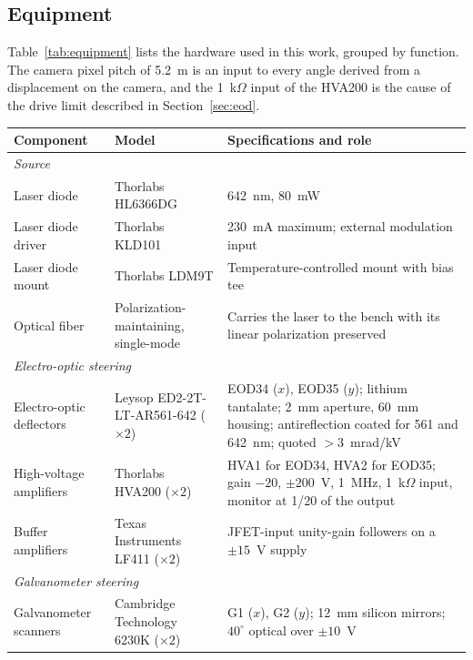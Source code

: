 \documentclass{article}
\begin{document}
\clearpage
\printbibliography
\begin{appendices}
\clearpage
\section{Equipment}
\label{app:equipment}

Table~\ref{tab:equipment} lists the hardware used in this work, grouped by function. The camera
pixel pitch of 5.2~\textmu m is an input to every angle derived from a displacement on the camera,
and the 1~k$\Omega$ input of the HVA200 is the cause of the drive limit described in
Section~\ref{sec:eod}.

\begin{table}[!htbp]
    \centering
    \small
    \begin{tabular}{p{}p{}p{}}
        \hline
        Component & Model & Specifications and role \\
        \hline
        \multicolumn{3}{l}{\emph{Source}} \\
        Laser diode & Thorlabs HL6366DG & 642~nm, 80~mW \\
        Laser diode driver & Thorlabs KLD101 & 230~mA maximum; external modulation input \\
        Laser diode mount & Thorlabs LDM9T & Temperature-controlled mount with bias tee \\
        Optical fiber & Polarization-maintaining, single-mode & Carries the laser to the bench with its linear polarization preserved \\
        \multicolumn{3}{l}{\emph{Electro-optic steering}} \\
        Electro-optic deflectors & Leysop ED2-2T-LT-AR561-642 ($\times2$) & EOD34 ($x$), EOD35 ($y$); lithium tantalate; 2~mm aperture, 60~mm housing; antireflection coated for 561 and 642~nm; quoted ${>}3$~mrad/kV \\
        High-voltage amplifiers & Thorlabs HVA200 ($\times2$) & HVA1 for EOD34, HVA2 for EOD35; gain $-20$, $\pm200$~V, 1~MHz, 1~k$\Omega$ input, monitor at 1/20 of the output \\
        Buffer amplifiers & Texas Instruments LF411 ($\times2$) & JFET-input unity-gain followers on a $\pm15$~V supply \\
        \multicolumn{3}{l}{\emph{Galvanometer steering}} \\
        Galvanometer scanners & Cambridge Technology 6230K ($\times2$) & G1 ($x$), G2 ($y$); 12~mm silicon mirrors; $40^\circ$ optical over $\pm10$~V \\

\end{tabular}
\end{table}
\end{appendices}
\end{document}
